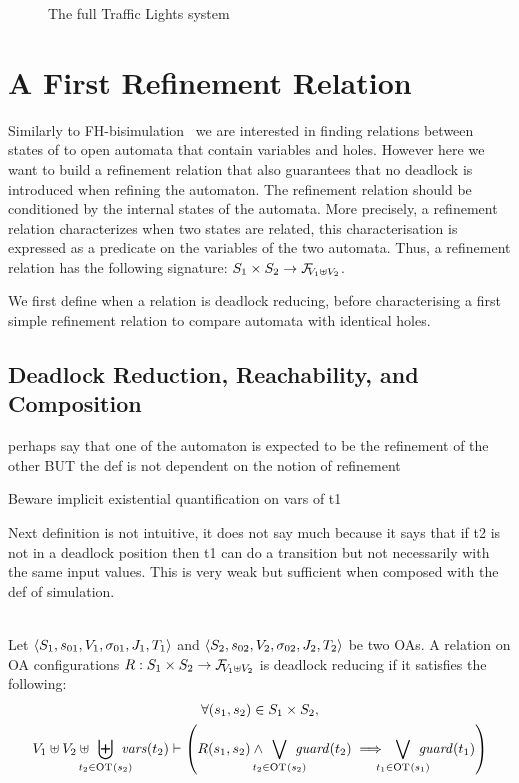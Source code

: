 \documentclass[runningheads]{llncs}
\begin{document}
\begin{figure}[!tb]
\centering
\scalebox{.75}{}
\caption{The full Traffic Lights system}
\label{fig:tlf}
\end{figure}


\section{A First Refinement Relation}\label{sec:refinement}

Similarly to FH-bisimulation~\cite{fhbisim} we are interested  in finding relations between states of to open automata that contain variables and holes. However here we want to build a refinement relation that  also guarantees that no deadlock is introduced when refining the automaton.
The refinement relation should be conditioned by the internal states of the automata. More precisely, a refinement relation characterizes when two states are related, this  characterisation is expressed as a predicate on the variables of the two automata.
Thus, a refinement relation has the following signature: \( S_1 \times S_2 \to \rformulas[V_1 \uplus V_2]\).

We first define when a relation is deadlock reducing, before characterising a first simple refinement relation  to compare automata with identical holes.

\subsection{Deadlock Reduction, Reachability, and Composition}


perhaps say that one of the automaton is expected to be the refinement of the other BUT the def is not dependent on the notion of refinement

Beware implicit existential quantification on vars of t1

Next definition is not intuitive, it does not say much because it says that if t2 is not in a deadlock position then t1 can do a transition but not necessarily with the same input values. This is very weak but sufficient when composed with the def  of simulation.

\begin{definition}\label{def:dpwd}\\
Let \(\OAg[1]\) and \(\OAg[2]\) be two OAs.
A relation on OA configurations \(R: S_1 \times S_2 \to \rformulas[V_1 \uplus V_2]\) is deadlock reducing if  it satisfies the following:
\begin{multline*}
 \forall \mpar{s_1, s_2} \in S_1 \times S_2,\\ V_1 \uplus V_2 \uplus \biguplus_\subbox{t_2 \in \fOT{s_2}} \fvars{t_2} \vdash \left(R\mpar{s_1, s_2} \wedge \bigvee_\subbox{t_2 \in \fOT{s_2}} \fguard{t_2} \implies \bigvee_\subbox{t_1 \in \fOT{s_1}} \fguard{t_1} \right)
\end{multline*}
\end{definition}
\end{document}
